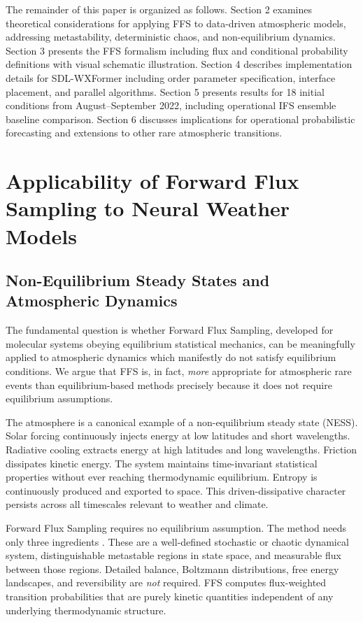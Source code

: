 \documentclass[11pt]{article}
\begin{document}
The remainder of this paper is organized as follows. Section 2 examines theoretical considerations for applying FFS to data-driven atmospheric models, addressing metastability, deterministic chaos, and non-equilibrium dynamics. Section 3 presents the FFS formalism including flux and conditional probability definitions with visual schematic illustration. Section 4 describes implementation details for SDL-WXFormer including order parameter specification, interface placement, and parallel algorithms. Section 5 presents results for 18 initial conditions from August--September 2022, including operational IFS ensemble baseline comparison. Section 6 discusses implications for operational probabilistic forecasting and extensions to other rare atmospheric transitions.
\section{Applicability of Forward Flux Sampling to Neural Weather Models}

\subsection{Non-Equilibrium Steady States and Atmospheric Dynamics}

The fundamental question is whether Forward Flux Sampling, developed for molecular systems obeying equilibrium statistical mechanics, can be meaningfully applied to atmospheric dynamics which manifestly do not satisfy equilibrium conditions. We argue that FFS is, in fact, \textit{more} appropriate for atmospheric rare events than equilibrium-based methods precisely because it does not require equilibrium assumptions.

The atmosphere is a canonical example of a non-equilibrium steady state (NESS). Solar forcing continuously injects energy at low latitudes and short wavelengths. Radiative cooling extracts energy at high latitudes and long wavelengths. Friction dissipates kinetic energy. The system maintains time-invariant statistical properties without ever reaching thermodynamic equilibrium. Entropy is continuously produced and exported to space. This driven-dissipative character persists across all timescales relevant to weather and climate.

Forward Flux Sampling requires no equilibrium assumption. The method needs only three ingredients \citep{allen2009forward}. These are a well-defined stochastic or chaotic dynamical system, distinguishable metastable regions in state space, and measurable flux between those regions. Detailed balance, Boltzmann distributions, free energy landscapes, and reversibility are \textit{not} required. FFS computes flux-weighted transition probabilities that are purely kinetic quantities independent of any underlying thermodynamic structure.
\end{document}
